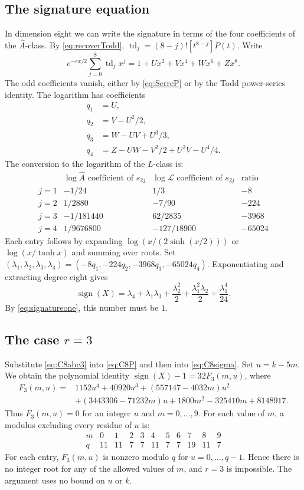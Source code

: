 \documentclass[11pt,reqno,letterpaper]{amsart}
\newcommand{\td}{\operatorname{td}}
\newcommand{\sgn}{\operatorname{sign}}
\newcommand{\Ahat}{\widehat A}
\theoremstyle{definition}
\numberwithin{equation}{section}
\begin{document}
\subsection{The signature equation}
In dimension eight we can write the signature in terms of the four
coefficients of the $\widehat A$-class. By \eqref{eq:recoverTodd},
$\td_j=(8-j)![t^{8-j}]P(t)$. Write
\[
 e^{-rx/2}\sum_{j=0}^8\td_jx^j
 =1+Ux^2+Vx^4+Wx^6+Zx^8.
\]
The odd coefficients vanish, either by \eqref{eq:SerreP} or by the
Todd power-series identity. The logarithm has coefficients
\begin{align*}
 q_1&=U,\\
 q_2&=V-U^2/2,\\
 q_3&=W-UV+U^3/3,\\
 q_4&=Z-UW-V^2/2+U^2V-U^4/4.
\end{align*}
The conversion to the logarithm of the $L$-class is:
\[
\begin{array}{c|c|c|c}
 &\log\Ahat\text{ coefficient of }s_{2j}
 &\log\mathcal L\text{ coefficient of }s_{2j}&\text{ratio}\\ \hline
j=1&-1/24&1/3&-8\\
j=2&1/2880&-7/90&-224\\
j=3&-1/181440&62/2835&-3968\\
j=4&1/9676800&-127/18900&-65024
\end{array}
\]
Each entry follows by expanding $\log(x/(2\sinh(x/2)))$ or
$\log(x/\tanh x)$ and summing over roots.
Set $(\lambda_1,\lambda_2,\lambda_3,\lambda_4)
=(-8q_1,-224q_2,-3968q_3,-65024q_4)$.
Exponentiating and extracting degree eight gives
\begin{equation}\label{eq:C8sigma}
 \sgn(X)=\lambda_4+\lambda_1\lambda_3+\frac{\lambda_2^2}{2}
              +\frac{\lambda_1^2\lambda_2}{2}+\frac{\lambda_1^4}{24}.
\end{equation}
By \eqref{eq:signatureone}, this number must be $1$.

\subsection{The case \texorpdfstring{$r=3$}{r=3}}
Substitute \eqref{eq:C8abc3} into \eqref{eq:C8P} and then into
\eqref{eq:C8sigma}. Set $u=k-5m$. We obtain the polynomial identity
$\sgn(X)-1=32F_3(m,u)$, where
\begin{align}
 F_3(m,u)={}&1152u^4+40920u^3+(557147-4032m)u^2\nonumber\\
 &+(3443306-71232m)u+1800m^2-325410m+8148917.
 \label{eq:C8F3}
\end{align}
Thus $F_3(m,u)=0$ for an integer $u$ and $m=0,\ldots,9$.
For each value of $m$, a modulus excluding every residue of $u$ is:
\[
\begin{array}{c|rrrrrrrrrr}
m&0&1&2&3&4&5&6&7&8&9\\ \hline
q&11&11&7&7&11&7&7&19&11&7
\end{array}
\]
For each entry, $F_3(m,u)$ is nonzero modulo $q$ for
$u=0,\ldots,q-1$. Hence there is no integer root for any of the
allowed values of $m$, and $r=3$ is impossible. The argument uses
no bound on $u$ or $k$.
\end{document}
